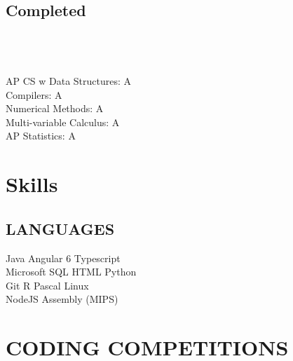 \documentclass[]{deedy-resume-openfont}
\begin{document}
\begin{minipage}[t]{0.3\textwidth}
\subsection{Completed}
\\
\\
\\
\textbullet{} AP CS w Data Structures: A \\
\textbullet{} Compilers: A \\
\textbullet{} Numerical Methods: A \\
\textbullet{} Multi-variable Calculus: A \\
\textbullet{} AP Statistics: A \\
\sectionsep

\vspace{1.5cm}

\section{Skills}
\subsection{LANGUAGES}
Java \textbullet{}Angular 6 \textbullet{} Typescript \\
Microsoft SQL \textbullet{} HTML \textbullet{}Python \\
Git \textbullet{} R \textbullet{} Pascal \textbullet{} Linux \\ 
NodeJS \textbullet{} Assembly (MIPS) 

\vspace{1.5cm}
\section{CODING COMPETITIONS}

\sectionsep

\sectionsep



%
%

\end{minipage} 
\end{document}
